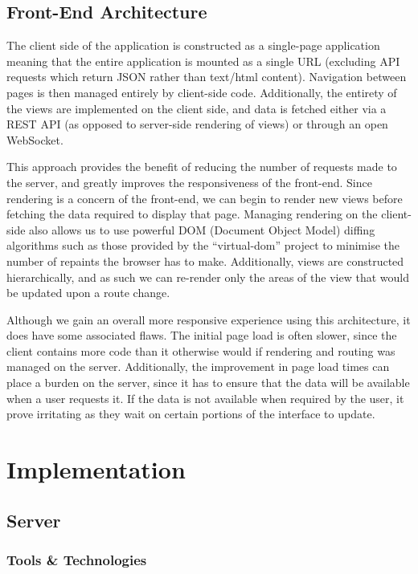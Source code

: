 \documentclass{l4proj}
\begin{document}
        
    \section{Front-End Architecture}
    The client side of the application is constructed as a single-page application meaning that the entire application is mounted as a single URL (excluding API requests which return JSON rather than text/html content). Navigation between pages is then managed entirely by client-side code. Additionally, the entirety of the views are implemented on the client side, and data is fetched either via a REST API (as opposed to server-side rendering of views) or through an open WebSocket. 

This approach provides the benefit of reducing the number of requests made to the server, and greatly improves the responsiveness of the front-end. Since rendering is a concern of the front-end, we can begin to render new views before fetching the data required to display that page. Managing rendering on the client-side also allows us to use powerful DOM (Document Object Model) diffing algorithms such as those provided by the ``virtual-dom'' project to minimise the number of repaints the browser has to make. Additionally, views are constructed hierarchically, and as such we can re-render only the areas of the view that would be updated upon a route change.

Although we gain an overall more responsive experience using this architecture, it does have some associated flaws. The initial page load is often slower, since the client contains more code than it otherwise would if rendering and routing was managed on the server. Additionally, the improvement in page load times can place a burden on the server, since it has to ensure that the data will be available when a user requests it. If the data is not available when required by the user, it prove irritating as they wait on certain portions of the interface to update.


\chapter{Implementation}

\section{Server}
    \subsection{Tools \& Technologies}
\end{document}
